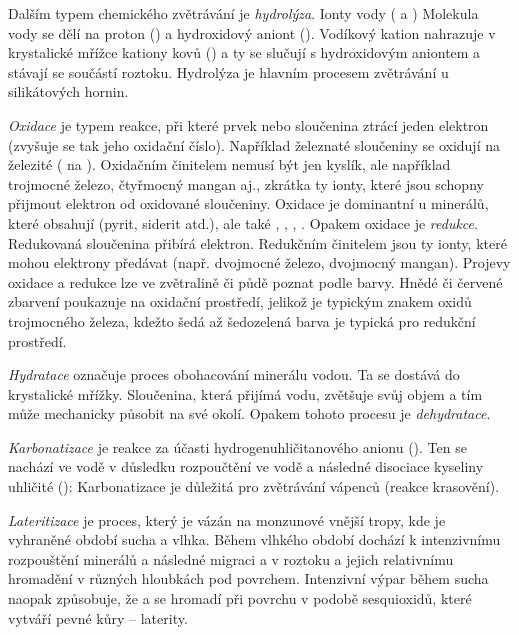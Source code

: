 Dalším typem chemického zvětrávání je \emph{hydrolýza}. Ionty vody ( a )  Molekula vody se dělí na proton () a hydroxidový aniont (). Vodíkový kation nahrazuje v krystalické mřížce kationy kovů () a ty se slučují s hydroxidovým aniontem a stávají se součástí roztoku. Hydrolýza je hlavním procesem zvětrávání u silikátových hornin.

\emph{Oxidace} je typem reakce, při které prvek nebo sloučenina ztrácí jeden elektron (zvyšuje se tak jeho oxidační číslo). Například železnaté sloučeniny se oxidují na železité ( na ). Oxidačním činitelem nemusí být jen kyslík, ale například trojmocné železo, čtyřmocný mangan aj., zkrátka ty ionty, které jsou schopny přijmout elektron od oxidované sloučeniny. Oxidace je dominantní u minerálů, které obsahují  (pyrit, siderit atd.), ale také , , , . Opakem oxidace je \emph{redukce}. Redukovaná sloučenina přibírá elektron. Redukčním činitelem jsou ty ionty, které mohou elektrony předávat (např. dvojmocné železo, dvojmocný mangan). Projevy oxidace a redukce lze ve zvětralině či půdě poznat podle barvy. Hnědé či červené zbarvení poukazuje na oxidační prostředí, jelikož je typickým znakem oxidů trojmocného železa, kdežto šedá až šedozelená barva je typická pro redukční prostředí.


\emph{Hydratace} označuje proces obohacování minerálu vodou. Ta se dostává do krystalické mřížky. Sloučenina, která přijímá vodu, zvětšuje svůj objem a tím může mechanicky působit na své okolí. Opakem tohoto procesu je \emph{dehydratace}.

\emph{Karbonatizace} je reakce za účasti hydrogenuhličitanového anionu (). Ten se nachází ve vodě v důsledku rozpoučtění  ve vodě a následné disociace kyseliny uhličité (): 
Karbonatizace je důležitá pro zvětrávání vápenců (reakce krasovění).

\emph{Lateritizace} je proces, který je vázán na monzunové vnější tropy, kde je vyhraněné období sucha a vlhka. Během vlhkého období dochází k intenzivnímu rozpouštění minerálů a následné migraci  a  v roztoku a jejich relativnímu hromadění v různých hloubkách pod povrchem. Intenzivní výpar během sucha naopak způsobuje, že  a  se hromadí při povrchu v podobě sesquioxidů, které vytváří pevné kůry -- laterity.

